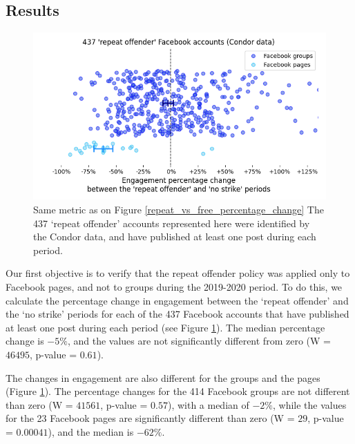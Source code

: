 \documentclass[review]{elsarticle}
\begin{document}
\subsection{Results}

\begin{figure}[!h]
\centering
\includegraphics[scale=0.5]{./../figure/condor_repeat_vs_free_percentage_change.png}
\caption{
Same metric as on Figure \ref{repeat_vs_free_percentage_change}
The 437 `repeat offender' accounts represented here were identified by the Condor data, and have published at least one post during each period.
}
\label{condor_repeat_vs_free_percentage_change}
\end{figure}

Our first objective is to verify that the repeat offender policy was applied only to Facebook pages, and not to groups during the 2019-2020 period.
To do this, we calculate the percentage change in engagement between the `repeat offender' and the `no strike' periods for each of the 437 Facebook accounts that have published at least one post during each period (see Figure \ref{condor_repeat_vs_free_percentage_change}). 
The median percentage change is $-5\%$, and the values are not significantly different from zero (W = $46495$, p-value = $0.61$).

The changes in engagement are also different for the groups and the pages (Figure \ref{condor_repeat_vs_free_percentage_change}). 
The percentage changes for the 414 Facebook groups are not different than zero (W = $41561$, p-value = $0.57$), with a median of $-2\%$, while the values for the 23 Facebook pages are significantly different than zero (W = $29$, p-value = $0.00041$), and the median is $-62\%$.
\end{document}
